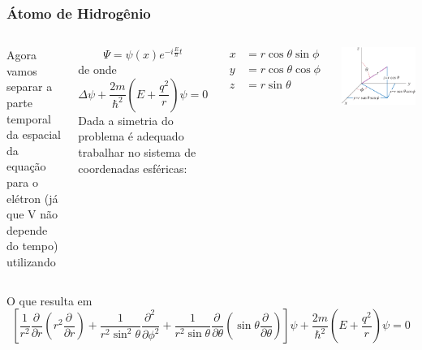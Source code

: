 \documentclass[12pt,brazil,table]{beamer}
\begin{document}
\begin{frame}
  \frametitle{Átomo de Hidrogênio}
  \fontsize{9pt}{11pt}\selectfont
  
  
  
  \vspace*{-1cm}
  \begin{minipage}[t][20ex][t]{\linewidth}
  
  \begin{columns}
          Agora vamos separar a parte temporal da espacial da equação para o elétron (já que V não depende do tempo) utilizando 

        \[
          \Psi = \psi(x)e^{-i\frac{E}{\hbar}t}
        \]
        de onde
        \[
          \Delta \psi + \dfrac{2m}{\hbar^2}\left( E + \dfrac{q^2}{r} \right)\psi = 0
        \]
        Dada a simetria do problema é adequado trabalhar no sistema de coordenadas esféricas:
        
        
        
        
        \[
          \begin{align*}
            x &= r\cos \theta \sin \phi\\
            y &= r\cos \theta \cos \phi\\
            z &= r\sin\theta
          \end{align*}
        \]
        \begin{center}
        \includegraphics[width=4.5  cm]{figuras/fig38}
        \end{center}
        \end{columns}
   
  \end{minipage}

  
  \vspace*{0.5cm}
  \begin{minipage}[t][20ex][b]{\linewidth}
  O que resulta em
          \[
          \left[ \dfrac{1}{r^2} \dfrac{\partial \,}{\partial r}\left(r^2\dfrac{\partial\,}{\partial r} \right) + \dfrac{1}{r^2\sin^2\theta}\dfrac{\partial^2 \,}{\partial \phi^2}+ \dfrac{1}{r^2\sin \theta }\dfrac{\partial \,}{\partial \theta}\left(\sin \theta\dfrac{\partial \,}{\partial \theta} \right) \right]\psi + \dfrac{2m}{\hbar^2}\left( E + \dfrac{q^2}{r} \right)\psi = 0
        \]  
  \end{minipage}
  
\end{frame}
\end{document}
